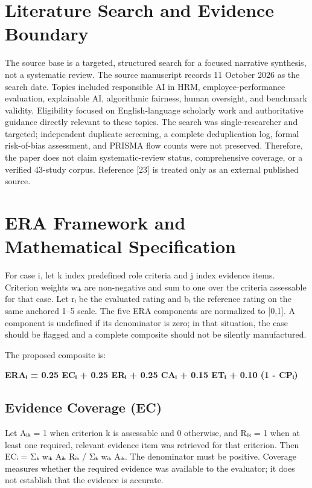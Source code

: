 \documentclass[
  10pt,
  runningheads]{llncs}
\begin{document}
\section{Literature Search and Evidence
Boundary}\label{literature-search-and-evidence-boundary}

The source base is a targeted, structured search for a focused narrative synthesis, not a systematic review. The source manuscript records 11 October 2026 as the search date. Topics included responsible AI in HRM, employee-performance evaluation, explainable AI, algorithmic fairness, human oversight, and benchmark validity. Eligibility focused on English-language scholarly work and authoritative guidance directly relevant to these topics. The search was single-researcher and targeted; independent duplicate screening, a complete deduplication log, formal risk-of-bias assessment, and PRISMA flow counts were not preserved. Therefore, the paper does not claim systematic-review status, comprehensive coverage, or a verified 43-study corpus. Reference [23] is treated only as an external published source.

\section{ERA Framework and Mathematical
Specification}\label{era-framework-and-mathematical-specification}

For case i, let k index predefined role criteria and j index evidence
items. Criterion weights wᵢₖ are non-negative and sum to one over the
criteria assessable for that case. Let rᵢ be the evaluated rating and bᵢ
the reference rating on the same anchored 1--5 scale. The five ERA
components are normalized to {[}0,1{]}. A component is undefined if its
denominator is zero; in that situation, the case should be flagged and a
complete composite should not be silently manufactured.

The proposed composite is:

\textbf{ERAᵢ = 0.25 ECᵢ + 0.25 ERᵢ + 0.25 CAᵢ + 0.15 ETᵢ + 0.10 (1 -
CPᵢ)}

\subsection{Evidence Coverage (EC)}\label{evidence-coverage-ec}

Let Aᵢₖ = 1 when criterion k is assessable and 0 otherwise, and Rᵢₖ = 1
when at least one required, relevant evidence item was retrieved for
that criterion. Then ECᵢ = Σₖ wᵢₖ Aᵢₖ Rᵢₖ / Σₖ wᵢₖ Aᵢₖ. The denominator
must be positive. Coverage measures whether the required evidence was
available to the evaluator; it does not establish that the evidence is
accurate.
\end{document}
